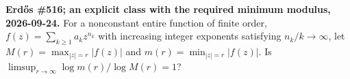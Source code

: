 \textbf{Erd\H{o}s \#516; an explicit class with the required minimum modulus, 2026-09-24.}
For a nonconstant entire function of finite order,
$f(z)=\sum_{k\geq1}a_kz^{n_k}$ with increasing integer exponents satisfying $n_k/k\to\infty$, let $M(r)=\max_{|z|=r}|f(z)|$ and $m(r)=\min_{|z|=r}|f(z)|$. Is $\limsup_{r\to\infty}\log m(r)/\log M(r)=1$?
